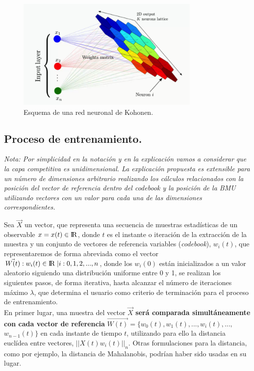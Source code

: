 \begin{figure}
\centering
\includegraphics[width=0.8\textwidth]{imagenes/arquitectura_som.png}

\caption{Esquema de una red neuronal de Kohonen.}
\end{figure}

\subsection{Proceso de entrenamiento.}
\textit{Nota: Por simplicidad en la notación y en la explicación vamos a considerar que la capa competitiva es unidimensional. La explicación propuesta es extensible para un número de dimensiones arbitrario realizando los cálculos relacionados con la posición del vector de referencia dentro del codebook y la posición de la BMU utilizando vectores con un valor para cada una de las dimensiones correspondientes.\\}

Sea $\vec{X}$ un vector, que representa una secuencia de muestras estadísticas de un observable $x=x(t) \in {\rm I\!R}$, donde $t$ es el instante o iteración de la extracción de la muestra y un conjunto de vectores de referencia variables (\textit{codebook}), $w_i(t)$, que representaremos de forma abreviada como el vector $\vec{W(t)}: w_i(t) \in {\rm I\!R} \; | i: 0, 1, 2, ..., n $, donde los $w_i(0)$ están inicializados a un valor aleatorio siguiendo una distribución uniforme entre 0 y 1, se realizan los siguientes pasos, de forma iterativa, hasta alcanzar el número de iteraciones máximo $\lambda$, que determina el usuario como criterio de terminación para el proceso de entrenamiento.\\

En primer lugar, una muestra del vector $\vec{X}$ \textbf{será comparada simultáneamente con cada vector de referencia} $\vec{W(t)} = \{w_0(t), w_1(t), ..., w_i(t), ...,$ ${w_{n-1}}(t)\}$ en cada instante de tiempo $t$, utilizando para ello la distancia euclídea entre vectores, $||{X(t)w_i(t)}||_n$. Otras formulaciones para la distancia, como por ejemplo, la distancia de Mahalanobis, podrían haber sido usadas en su lugar. \\

